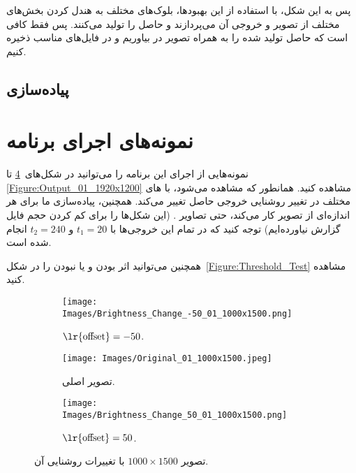 \documentclass[12pt,onecolumn,a4paper]{article}
\begin{document}
پس به این شکل، با استفاده از این بهبودها، بلوک‌های مختلف به هندل کردن بخش‌های مختلف از تصویر و خروجی آن می‌پردازند و حاصل را تولید می‌کنند. پس فقط کافی است که حاصل تولید شده را به همراه تصویر  در  بیاوریم و در فایل‌های مناسب ذخیره کنیم.

\subsection{پیاده‌سازی }

\section{نمونه‌های اجرای برنامه}
نمونه‌هایی از اجرای این برنامه را می‌توانید در شکل‌های~\ref{Figure:01_1000x1500} تا \ref{Figure:Output_01_1920x1200} مشاهده کنید. همانطور که مشاهده می‌شود، با های مختلف در تغییر روشنایی خروجی حاصل تغییر می‌کند. همچنین، پیاده‌سازی ما برای هر اندازه‌ای از تصویر کار می‌کند، حتی تصاویر . (این شکل‌ها را برای کم کردن حجم فایل گزارش نیاورده‌ایم) توجه کنید که در تمام این خروجی‌ها  با $t_1=20$ و $t_2=240$ انجام شده است.

همچنین می‌توانید اثر بودن و یا نبودن  را در شکل~\ref{Figure:Threshold_Test} مشاهده کنید.

\begin{figure}
     \centering
     \begin{subfigure}[b]{0.3\textwidth}
         \centering
         \texttt{[image: Images/Brightness\_Change\_-50\_01\_1000x1500.png]}
         \caption{$\text{\lr{offset}}=-50$.}
         \label{Figure:01_1000x1500_-50}
     \end{subfigure}
     \hfill
     \begin{subfigure}[b]{0.3\textwidth}
         \centering
         \texttt{[image: Images/Original\_01\_1000x1500.jpeg]}
         \caption{تصویر اصلی.}
         \label{Figure:01_1000x1500_0}
     \end{subfigure}
     \hfill
     \begin{subfigure}[b]{0.3\textwidth}
         \centering
         \texttt{[image: Images/Brightness\_Change\_50\_01\_1000x1500.png]}
         \caption{$\text{\lr{offset}}=50$.}
         \label{Figure:01_1000x1500_50}
     \end{subfigure}
\caption{تصویر $1000 \times 1500$ با تغییرات روشنایی آن.}
\label{Figure:01_1000x1500}
\end{figure}
\end{document}
